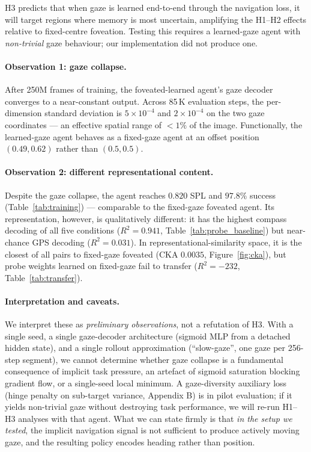 \documentclass[10pt,conference,compsocconf]{IEEEtran}
\begin{document}
H3 predicts that when gaze is learned end-to-end through the navigation loss, it will target regions where memory is most uncertain, amplifying the H1--H2 effects relative to fixed-centre foveation. Testing this requires a learned-gaze agent with \emph{non-trivial} gaze behaviour; our implementation did not produce one.

\paragraph{Observation 1: gaze collapse.} After 250M frames of training, the foveated-learned agent's gaze decoder converges to a near-constant output. Across 85\,K evaluation steps, the per-dimension standard deviation is $5\times 10^{-4}$ and $2\times 10^{-4}$ on the two gaze coordinates --- an effective spatial range of $<1\%$ of the image. Functionally, the learned-gaze agent behaves as a fixed-gaze agent at an offset position $(0.49, 0.62)$ rather than $(0.5, 0.5)$.

\paragraph{Observation 2: different representational content.} Despite the gaze collapse, the agent reaches $0.820$ SPL and $97.8\%$ success (Table~\ref{tab:training}) --- comparable to the fixed-gaze foveated agent. Its representation, however, is qualitatively different: it has the highest compass decoding of all five conditions ($R^2=0.941$, Table~\ref{tab:probe_baseline}) but near-chance GPS decoding ($R^2=0.031$). In representational-similarity space, it is the closest of all pairs to fixed-gaze foveated (CKA $0.0035$, Figure~\ref{fig:cka}), but probe weights learned on fixed-gaze fail to transfer ($R^2=-232$, Table~\ref{tab:transfer}).

\paragraph{Interpretation and caveats.} We interpret these as \emph{preliminary observations}, not a refutation of H3. With a single seed, a single gaze-decoder architecture (sigmoid MLP from a detached hidden state), and a single rollout approximation (``slow-gaze'', one gaze per 256-step segment), we cannot determine whether gaze collapse is a fundamental consequence of implicit task pressure, an artefact of sigmoid saturation blocking gradient flow, or a single-seed local minimum. A gaze-diversity auxiliary loss (hinge penalty on sub-target variance, Appendix B) is in pilot evaluation; if it yields non-trivial gaze without destroying task performance, we will re-run H1--H3 analyses with that agent. What we can state firmly is that \emph{in the setup we tested}, the implicit navigation signal is not sufficient to produce actively moving gaze, and the resulting policy encodes heading rather than position.
\end{document}
